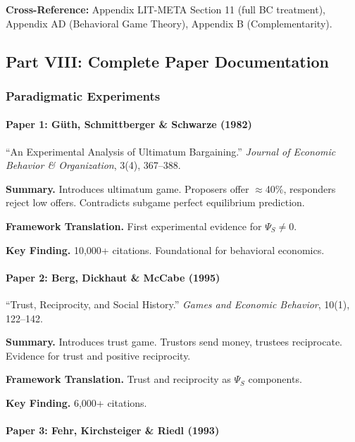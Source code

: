 \textbf{Cross-Reference:} Appendix LIT-META Section 11 (full BC treatment),
Appendix AD (Behavioral Game Theory), Appendix B (Complementarity).

\subsection{Part VIII: Complete Paper Documentation}

\subsubsection{Paradigmatic Experiments}

\paragraph{Paper 1: Güth, Schmittberger \& Schwarze (1982)}

``An Experimental Analysis of Ultimatum Bargaining.''
\textit{Journal of Economic Behavior \& Organization}, 3(4), 367--388.

\textbf{Summary.}
Introduces ultimatum game. Proposers offer $\approx$40\%, responders reject 
low offers. Contradicts subgame perfect equilibrium prediction.

\textbf{Framework Translation.}
First experimental evidence for $\Psi_S \neq 0$.

\textbf{Key Finding.}
10,000+ citations. Foundational for behavioral economics.

\paragraph{Paper 2: Berg, Dickhaut \& McCabe (1995)}

``Trust, Reciprocity, and Social History.''
\textit{Games and Economic Behavior}, 10(1), 122--142.

\textbf{Summary.}
Introduces trust game. Trustors send money, trustees reciprocate.
Evidence for trust and positive reciprocity.

\textbf{Framework Translation.}
Trust and reciprocity as $\Psi_S$ components.

\textbf{Key Finding.}
6,000+ citations.

\paragraph{Paper 3: Fehr, Kirchsteiger \& Riedl (1993)}

